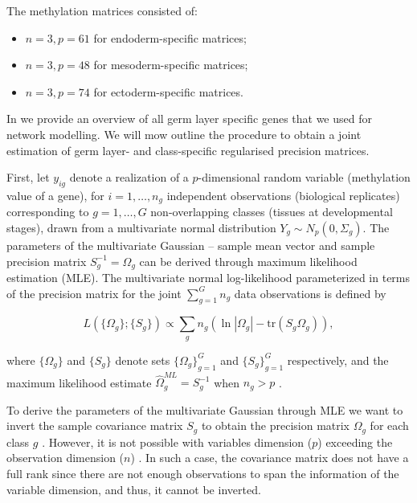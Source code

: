 \documentclass[
	a4paper, %
	10pt, %
	unnumberedsections, %
	twoside, %
]{LTJournalArticle}
\begin{document}
\noindent The methylation matrices consisted of:

\begin{itemize} 
    
    \item $n = 3, p = 61$ for endoderm-specific matrices;
    \item $n = 3, p = 48$ for mesoderm-specific matrices;
    \item $n = 3, p = 74$ for ectoderm-specific matrices.
\end{itemize}

\noindent In  we provide an overview of all germ layer specific genes
that we used for network modelling. We will mow outline the procedure to obtain a joint estimation 
of germ layer- and class-specific regularised precision 
matrices.\newline 

First, let $y_{ig}$ denote a realization of a $p$-dimensional random variable 
(methylation value of a gene), for $i=1,\ldots,n_g$ independent observations 
(biological replicates) corresponding to $g=1,\ldots,G$ non-overlapping classes 
(tissues at developmental stages), drawn from a multivariate normal 
distribution $Y_g \sim N_p(0, \Sigma_g)$. 
The parameters of the multivariate 
Gaussian – sample mean vector and sample 
precision matrix $S_g^{-1} = \Omega_g$ can be derived through maximum 
likelihood estimation (MLE).
The multivariate normal log-likelihood parameterized in terms of the precision matrix for 
the joint $\sum_{g=1}^{G} n_g$ data observations is defined by

\begin{equation} \label{eq:3}
	L(\{\Omega_g\}; \{S_g\}) \propto \sum_g n_g \left(\ln|\Omega_g| - \text{tr}(S_g \Omega_g)\right),
\end{equation}
	
\noindent where $\{\Omega_g\}$ and $\{S_g\}$ denote sets $\{\Omega_g\}_{g=1}^{G}$ 
and $\{S_g\}_{g=1}^{G}$ respectively, and the maximum likelihood estimate $\hat{\Omega}_g^{ML} = S_g^{-1}$ 
when $n_g > p$ \autocite{bilgrau2020a, peeters2022a}.

\noindent To derive the parameters of the multivariate Gaussian
through MLE we want to invert the sample covariance matrix $S_g$ to obtain the precision 
matrix $\Omega_g$ for each class $g$ \autocite{peeters2022a}. However, it is 
not possible with 
variables dimension ($p$) exceeding the observation dimension ($n$) 
\autocite{peeters2022a}. In such a case, the covariance matrix does not have 
a full rank since there 
are not enough observations to span the information of the variable dimension, 
and thus, it cannot be inverted. 
\end{document}
